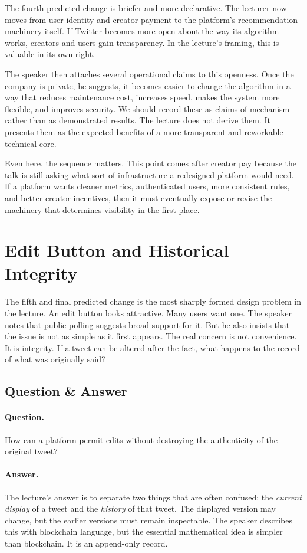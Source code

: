 The fourth predicted change is briefer and more declarative. The lecturer now moves from user identity and creator payment to the platform's recommendation machinery itself. If Twitter becomes more open about the way its algorithm works, creators and users gain transparency. In the lecture's framing, this is valuable in its own right.

The speaker then attaches several operational claims to this openness. Once the company is private, he suggests, it becomes easier to change the algorithm in a way that reduces maintenance cost, increases speed, makes the system more flexible, and improves security. We should record these as claims of mechanism rather than as demonstrated results. The lecture does not derive them. It presents them as the expected benefits of a more transparent and reworkable technical core.

Even here, the sequence matters. This point comes after creator pay because the talk is still asking what sort of infrastructure a redesigned platform would need. If a platform wants cleaner metrics, authenticated users, more consistent rules, and better creator incentives, then it must eventually expose or revise the machinery that determines visibility in the first place.

\section{Edit Button and Historical Integrity}

The fifth and final predicted change is the most sharply formed design problem in the lecture. An edit button looks attractive. Many users want one. The speaker notes that public polling suggests broad support for it. But he also insists that the issue is not as simple as it first appears. The real concern is not convenience. It is integrity. If a tweet can be altered after the fact, what happens to the record of what was originally said?

\subsection{Question \& Answer}

\paragraph{Question.}
How can a platform permit edits without destroying the authenticity of the original tweet?

\paragraph{Answer.}
The lecture's answer is to separate two things that are often confused: the \emph{current display} of a tweet and the \emph{history} of that tweet. The displayed version may change, but the earlier versions must remain inspectable. The speaker describes this with blockchain language, but the essential mathematical idea is simpler than blockchain. It is an append-only record.

